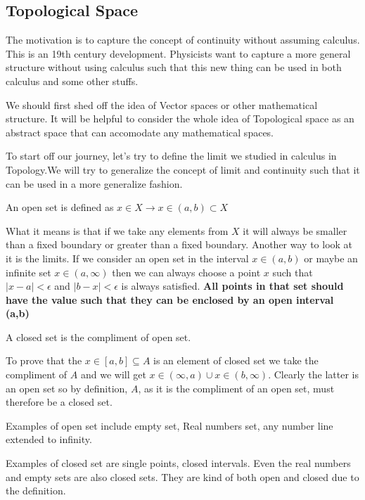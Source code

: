\documentclass{article}
\begin{document}
\subsection{Topological Space}
The motivation is to capture the concept of continuity without assuming calculus. This is an 19th century development. Physicists want to capture a more general structure without using calculus such that this new thing can be used in both calculus and some other stuffs. 

We should first shed off the idea of Vector spaces or other mathematical structure. It will be helpful to consider the whole idea of Topological space as an abstract space that can accomodate any mathematical spaces. 

To start off our journey, let's try to define the limit we studied in calculus in Topology.We will try to generalize the concept of limit and continuity such that it can be used in a more generalize fashion. 

\begin{theorem}
  An open set is defined as $ x \in X \rightarrow x \in (a,b) \subset X $
\end{theorem}

What it means is that if we take any elements from $ X $ it will always be smaller than a fixed boundary or greater than a fixed boundary. Another way to look at it is the limits. If we consider an open set in the interval $ x \in (a,b) $ or maybe an infinite set $ x \in (a,\infty) $ then we can always choose a point $ x  $ such that $ | x-a|< \epsilon $
and $ |b-x| < \epsilon $ is always satisfied. \textbf{All points in that set should have the value such that they can be enclosed by an open interval (a,b) }

\begin{theorem}
    A closed set is the compliment of open set.     
\end{theorem}

To prove that the $ x \in [a,b] \subseteq A $ is an element of closed set we take the compliment of $ A $ and we will get $ x \in (\infty, a) \cup  x \in (b,\infty) $. Clearly the latter is an open set so by definition, $ A $, as it is the compliment of an open set, must therefore be a closed set.   

Examples of open set include empty set, Real numbers set, any number line extended to infinity.

Examples of closed set are single points, closed intervals. Even the real numbers and empty sets are also closed sets. They are kind of both open and closed due to the definition. 
\end{document}
